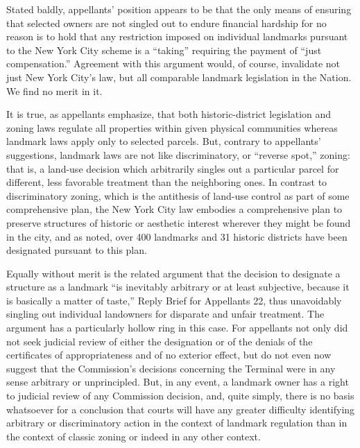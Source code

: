 Stated baldly, appellants' position appears to be that the only means of
ensuring that selected owners are not singled out to endure financial hardship
for no reason is to hold that any restriction imposed on individual landmarks
pursuant to the New York City scheme is a ``taking'' requiring the payment of
``just compensation.'' Agreement with this argument would, of course, invalidate
not just New York City's law, but all comparable landmark legislation in the
Nation. We find no merit in it.

It is true, as appellants emphasize, that both historic-district legislation and
zoning laws regulate all properties within given physical communities whereas
landmark laws apply only to selected parcels. But, contrary to appellants'
suggestions, landmark laws are not like discriminatory, or ``reverse spot,''
zoning: that is, a land-use decision which arbitrarily singles out a particular
parcel for different, less favorable treatment than the neighboring ones. In
contrast to discriminatory zoning, which is the antithesis of land-use control
as part of some comprehensive plan, the New York City law embodies a
comprehensive plan to preserve structures of historic or aesthetic interest
wherever they might be found in the city, and as noted, over 400 landmarks and
31 historic districts have been designated pursuant to this plan.

Equally without merit is the related argument that the decision to designate a
structure as a landmark ``is inevitably arbitrary or at least subjective,
because it is basically a matter of taste,'' Reply Brief for Appellants 22, thus
unavoidably singling out individual landowners for disparate and unfair
treatment. The argument has a particularly hollow ring in this case. For
appellants not only did not seek judicial review of either the designation or of
the denials of the certificates of appropriateness and of no exterior effect,
but do not even now suggest that the Commission's decisions concerning the
Terminal were in any sense arbitrary or unprincipled. But, in any event, a
landmark owner has a right to judicial review of any Commission decision, and,
quite simply, there is no basis whatsoever for a conclusion that courts will
have any greater difficulty identifying arbitrary or discriminatory action in
the context of landmark regulation than in the context of classic zoning or
indeed in any other context. 

